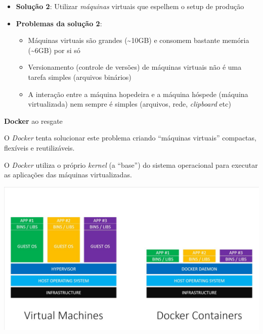 \documentclass[
  ignorenonframetext,
]{beamer}
\providecommand{\tightlist}{%
  \setlength{\itemsep}{0pt}\setlength{\parskip}{0pt}}
\begin{document}
\begin{frame}

\begin{itemize}
\tightlist
\item
  \textbf{Solução 2}: Utilizar \emph{máquinas} virtuais que espelhem o
  setup de produção
\item
  \textbf{Problemas da solução 2}:

  \begin{itemize}
  \tightlist
  \item
    Máquinas virtuais são grandes (\textasciitilde{}10GB) e consomem
    bastante memória (\textasciitilde{}6GB) por si só
  \item
    Versionamento (controle de versões) de máquinas virtuais não é uma
    tarefa simples (arquivos binários)
  \item
    A interação entre a máquina hopedeira e a máquina hóspede (máquina
    virtualizada) nem sempre é simples (arquivos, rede, \emph{clipboard}
    etc)
  \end{itemize}
\end{itemize}

\end{frame}

\begin{frame}{\textbf{Docker} ao resgate}
\protect\hypertarget{docker-ao-resgate}{}

O \emph{Docker} tenta solucionar este problema criando ``máquinas
virtuais'' compactas, flexíveis e reutilizáveis.

\end{frame}

\begin{frame}

O \emph{Docker} utiliza o próprio \emph{kernel} (a ``base'') do sistema
operacional para executar as aplicações das máquinas virtualizadas.

\includegraphics{img/vmvsdocker.jpg}

\end{frame}
\end{document}
